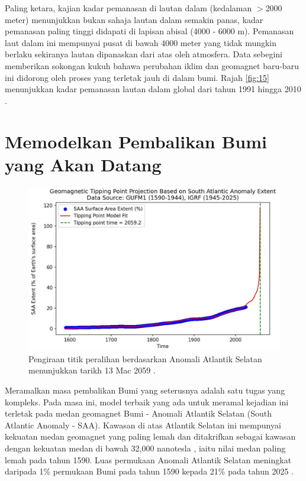 \documentclass[10pt,twocolumn,letterpaper]{article}
\begin{document}
Paling ketara, kajian kadar pemanasan di lautan dalam (kedalaman $>$2000 meter) menunjukkan bukan sahaja lautan dalam semakin panas, kadar pemanasan paling tinggi didapati di lapisan abisal (4000 - 6000 m). Pemanasan laut dalam ini mempunyai pusat di bawah 4000 meter \cite{132,129} yang tidak mungkin berlaku sekiranya lautan dipanaskan dari atas oleh atmosfera. Data sebegini memberikan sokongan kukuh bahawa perubahan iklim dan geomagnet baru-baru ini didorong oleh proses yang terletak jauh di dalam bumi. Rajah \ref{fig:15} menunjukkan kadar pemanasan lautan dalam global dari tahun 1991 hingga 2010 \cite{132}.
\section{Memodelkan Pembalikan Bumi yang Akan Datang}

\begin{figure}[b]
\begin{center}
   \includegraphics[width=1\linewidth]{saa-crop.jpeg}
\end{center}
   \caption{Pengiraan titik peralihan berdasarkan Anomali Atlantik Selatan menunjukkan tarikh 13 Mac 2059 \cite{125,126}.}
\label{fig:16}
\label{fig:onecol}
\end{figure}

Meramalkan masa pembalikan Bumi yang seterusnya adalah satu tugas yang kompleks. Pada masa ini, model terbaik yang ada untuk meramal kejadian ini terletak pada medan geomagnet Bumi - Anomali Atlantik Selatan (South Atlantic Anomaly - SAA). Kawasan di atas Atlantik Selatan ini mempunyai kekuatan medan geomagnet yang paling lemah dan ditakrifkan sebagai kawasan dengan kekuatan medan di bawah 32,000 nanotesla \cite{135}, iaitu nilai medan paling lemah pada tahun 1590. Luas permukaan Anomali Atlantik Selatan meningkat daripada 1\% permukaan Bumi pada tahun 1590 kepada 21\% pada tahun 2025 \cite{136}.
\end{document}
